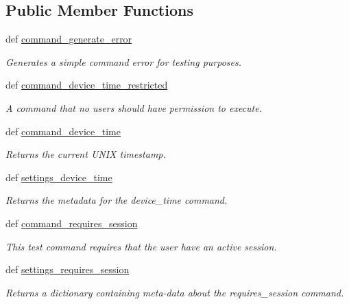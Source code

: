 \subsection*{Public Member Functions}
\begin{DoxyCompactItemize}
\item 
def \hyperlink{classhwm_1_1command_1_1tests_1_1utilities_1_1_test_command_handler_a8bb5fc141d663a277d8578bb39930c49}{command\-\_\-generate\-\_\-error}
\begin{DoxyCompactList}\small\item\em Generates a simple command error for testing purposes. \end{DoxyCompactList}\item 
def \hyperlink{classhwm_1_1command_1_1tests_1_1utilities_1_1_test_command_handler_a5ccc7433c4ff802af458c7e65f23c045}{command\-\_\-device\-\_\-time\-\_\-restricted}
\begin{DoxyCompactList}\small\item\em A command that no users should have permission to execute. \end{DoxyCompactList}\item 
def \hyperlink{classhwm_1_1command_1_1tests_1_1utilities_1_1_test_command_handler_adb0e7cf69571f0916d432ab09f5a3430}{command\-\_\-device\-\_\-time}
\begin{DoxyCompactList}\small\item\em Returns the current U\-N\-I\-X timestamp. \end{DoxyCompactList}\item 
def \hyperlink{classhwm_1_1command_1_1tests_1_1utilities_1_1_test_command_handler_a756e6459670bed51e1a57de07eabd1c1}{settings\-\_\-device\-\_\-time}
\begin{DoxyCompactList}\small\item\em Returns the metadata for the device\-\_\-time command. \end{DoxyCompactList}\item 
def \hyperlink{classhwm_1_1command_1_1tests_1_1utilities_1_1_test_command_handler_ac4fbb6239e6ed39d60fe59d8a81ae4fb}{command\-\_\-requires\-\_\-session}
\begin{DoxyCompactList}\small\item\em This test command requires that the user have an active session. \end{DoxyCompactList}\item 
def \hyperlink{classhwm_1_1command_1_1tests_1_1utilities_1_1_test_command_handler_a763544b8b57c21161d188d5e6c1a7256}{settings\-\_\-requires\-\_\-session}
\begin{DoxyCompactList}\small\item\em Returns a dictionary containing meta-\/data about the requires\-\_\-session command. \end{DoxyCompactList}\end{DoxyCompactItemize}


